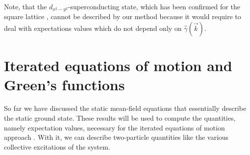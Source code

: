 \documentclass[
    reprint, 
    aps,
    preprintnumbers,
    twocolumn,
    prb,
    superscriptaddress
]{revtex4-2}
\newcommand{\vk}{\vec{k}}
\begin{document}
Note, that the $d_{x^2 - y^2}$-superconducting state, which has been confirmed for the square lattice 
\cite{Micnas88b,Huang13}, cannot be described by our method because it would require to 
deal with expectations values which do not depend only on $\widehat{\gamma}(\vk)$.


\section{Iterated equations of motion and Green's functions}\label{sec:ieom}

So far we have discussed the static mean-field equations that essentially describe the static ground state.
These results will be used to compute the quantities, namely expectation values, necessary for the iterated equations of motion approach \cite{uhrig09,hamerla13,hamerla14,bleicker18}.
With it, we can describe two-particle quantities like the various collective excitations of the system.
\end{document}
